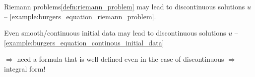 \begin{sectionbox}[Problems]\nospacing
    \begin{circlelistnosep}
        \item Riemann problems\cref{defn:riemann_problem} may lead to discontinuous solutions
        $u$ -- \cref{example:burgers_equation_riemann_problem}.
        \item Even smooth/continuous initial data may lead to discontinuous solutions $u$ -- \cref{example:burgers_equation_continous_initial_data}
    \end{circlelistnosep}
    $\Rightarrow$ need a formula that is well defined even in the case of discontinuous $\Rightarrow$ integral form!
\end{sectionbox}


